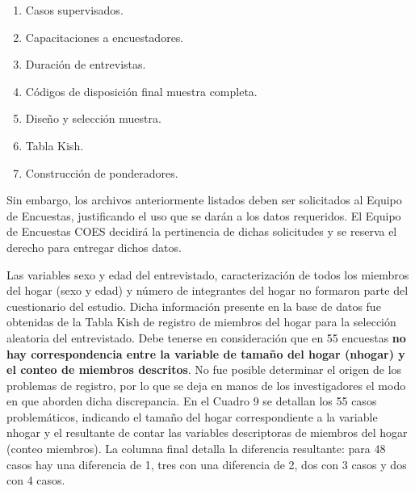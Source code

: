 \documentclass[
]{book}
\providecommand{\tightlist}{%
  \setlength{\itemsep}{0pt}\setlength{\parskip}{0pt}}
\begin{document}
\begin{enumerate}
\def\labelenumi{\arabic{enumi}.}
\tightlist
\item
  Casos supervisados.
\item
  Capacitaciones a encuestadores.
\item
  Duración de entrevistas.
\item
  Códigos de disposición final muestra completa.
\item
  Diseño y selección muestra.
\item
  Tabla Kish.
\item
  Construcción de ponderadores.
\end{enumerate}

Sin embargo, los archivos anteriormente listados deben ser solicitados al Equipo de Encuestas, justificando el uso que se darán a los datos requeridos. El Equipo de Encuestas COES decidirá la pertinencia de dichas solicitudes y se reserva el derecho para entregar dichos datos.

Las variables sexo y edad del entrevistado, caracterización de todos los miembros del hogar (sexo y edad) y número de integrantes del hogar no formaron parte del cuestionario del estudio. Dicha información presente en la base de datos fue obtenidas de la Tabla Kish de registro de miembros del hogar para la selección aleatoria del entrevistado. Debe tenerse en consideración que en 55 encuestas \textbf{no hay correspondencia entre la variable de tamaño del hogar (nhogar) y el conteo de miembros descritos}. No fue posible determinar el origen de los problemas de registro, por lo que se deja en manos de los investigadores el modo en que aborden dicha discrepancia. En el Cuadro 9 se detallan los 55 casos problemáticos, indicando el tamaño del hogar correspondiente a la variable nhogar y el resultante de contar las variables descriptoras de miembros del hogar (conteo miembros). La columna final detalla la diferencia resultante: para 48 casos hay una diferencia de 1, tres con una diferencia de 2, dos con 3 casos y dos con 4 casos.
\end{document}
